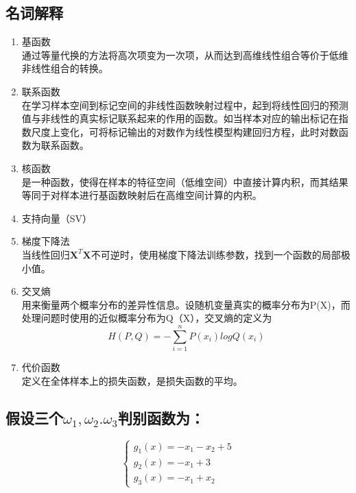 \documentclass{ctexart}
\begin{document}
\subsection*{名词解释}
\begin{enumerate}[(1)]
\item 基函数\\
通过等量代换的方法将高次项变为一次项，从而达到高维线性组合等价于低维非线性组合的转换。
\item 联系函数\\
在学习样本空间到标记空间的非线性函数映射过程中，起到将线性回归的预测值与非线性的真实标记联系起来的作用的函数。如当样本对应的输出标记在指数尺度上变化，可将标记输出的对数作为线性模型构建回归方程，此时对数函数为联系函数。
\item 核函数\\
是一种函数，使得在样本的特征空间（低维空间）中直接计算内积，而其结果等同于对样本进行基函数映射后在高维空间计算的内积。
\item 支持向量（SV）\\

\item 梯度下降法\\
当线性回归$\mathbf{X}^T\mathbf{X}$不可逆时，使用梯度下降法训练参数，找到一个函数的局部极小值。

\item 交叉熵\\
用来衡量两个概率分布的差异性信息。设随机变量真实的概率分布为P(X)，而处理问题时使用的近似概率分布为Q（X），交叉熵的定义为
\begin{equation*}
H(P,Q)=-\sum^n_{i=1}P(x_i)logQ(x_i)
\end{equation*}
\item 代价函数\\
定义在全体样本上的损失函数，是损失函数的平均。
\end{enumerate}

\subsection*{假设三个$\omega_1,\omega_2.\omega_3$判别函数为：}

\begin{equation}
\left\{
\begin{aligned}g_1(x)=-x_1-x_2+5\\
g_2(x)=-x_1+3\\
g_3(x)=-x_1+x_2
\end{aligned}
\right.
\end{equation}
\end{document}
